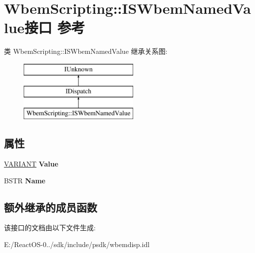 \hypertarget{interface_wbem_scripting_1_1_i_s_wbem_named_value}{}\section{Wbem\+Scripting\+:\+:I\+S\+Wbem\+Named\+Value接口 参考}
\label{interface_wbem_scripting_1_1_i_s_wbem_named_value}
类 Wbem\+Scripting\+:\+:I\+S\+Wbem\+Named\+Value 继承关系图\+:\begin{figure}[H]
\begin{center}
\leavevmode
\includegraphics[height=3.000000cm]{interface_wbem_scripting_1_1_i_s_wbem_named_value}
\end{center}
\end{figure}
\subsection*{属性}
\begin{DoxyCompactItemize}
\item 
\mbox{\label{interface_wbem_scripting_1_1_i_s_wbem_named_value_a8636e7a903b80f36fe3f1c1b42eab452}} 
\hyperlink{structtag_v_a_r_i_a_n_t}{V\+A\+R\+I\+A\+NT} {\bfseries Value}
\item 
\mbox{\label{interface_wbem_scripting_1_1_i_s_wbem_named_value_ae1e3a1a54dfa1988c2f1a88d97c47ec1}} 
B\+S\+TR {\bfseries Name}
\end{DoxyCompactItemize}
\subsection*{额外继承的成员函数}


该接口的文档由以下文件生成\+:\begin{DoxyCompactItemize}
\item 
E\+:/\+React\+O\+S-\/0../sdk/include/psdk/wbemdisp.\+idl\end{DoxyCompactItemize}
